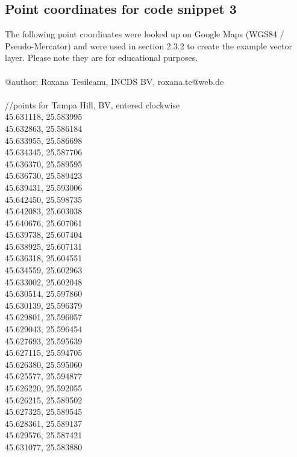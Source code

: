\documentclass {article}
\begin{document}
\begin{appendices}
\section {Point coordinates for code snippet 3}

The following point coordinates were looked up on Google Maps (WGS84 / Pseudo-Mercator) and were used in section 2.3.2 to create the example vector layer. Please note they are for educational purposes.
\\
\\
@author: Roxana Tesileanu, INCDS BV, roxana.te@web.de
\\
\\
//points for Tampa Hill, BV, entered clockwise\\
45.631118, 25.583995\\
45.632863, 25.586184\\
45.633955, 25.586698\\
45.634345, 25.587706\\
45.636370, 25.589595\\
45.636730, 25.589423\\
45.639431, 25.593006\\
45.642450, 25.598735\\
45.642083, 25.603038\\
45.640676, 25.607061\\
45.639738, 25.607404\\
45.638925, 25.607131\\
45.636318, 25.604551\\
45.634559, 25.602963\\
45.633002, 25.602048\\
45.630514, 25.597860\\
45.630139, 25.596379\\
45.629801, 25.596057\\
45.629043, 25.596454\\
45.627693, 25.595639\\
45.627115, 25.594705\\
45.626380, 25.595060\\
45.625577, 25.594877\\
45.626220, 25.592055\\
45.626215, 25.589502\\
45.627325, 25.589545\\
45.628361, 25.589137\\
45.629576, 25.587421\\
45.631077, 25.583880\\

\end{appendices}
\end{document}
